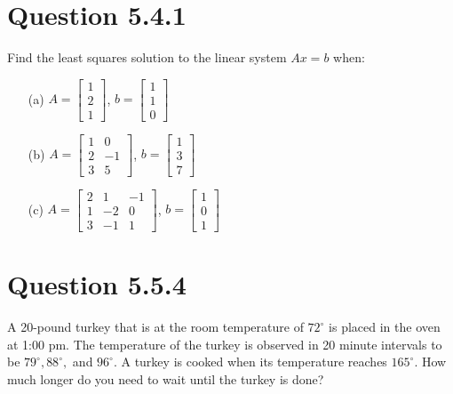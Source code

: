 \documentclass[12pt]{article}
\begin{document}
\section*{Question 5.4.1}
Find the least squares solution to the linear system \( Ax = b \) when:
\begin{itemize}
    \item[(a)] \( A = \begin{bmatrix} 1 \\ 2 \\ 1 \end{bmatrix} \), \( b = \begin{bmatrix} 1 \\ 1 \\ 0 \end{bmatrix} \)
    \item[(b)] \( A = \begin{bmatrix} 1 & 0 \\ 2 & -1 \\ 3 & 5 \end{bmatrix} \), \( b = \begin{bmatrix} 1 \\ 3 \\ 7 \end{bmatrix} \)
    \item[(c)] \( A = \begin{bmatrix} 2 & 1 & -1 \\ 1 & -2 & 0 \\ 3 & -1 & 1 \end{bmatrix} \), \( b = \begin{bmatrix} 1 \\ 0 \\ 1 \end{bmatrix} \)
\end{itemize}

\section*{Question 5.5.4}
A 20-pound turkey that is at the room temperature of \( 72^\circ \) is placed in the oven at 1:00 pm. The temperature of the turkey is observed in 20 minute intervals to be \( 79^\circ, 88^\circ, \) and \( 96^\circ \). A turkey is cooked when its temperature reaches \( 165^\circ \). How much longer do you need to wait until the turkey is done?
\end{document}
